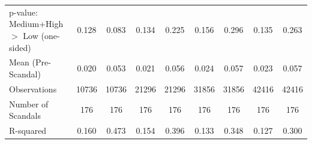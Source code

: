 {\begin{tabular}{l*{8}{c}}
p-value: Medium+High $>$ Low (one-sided)&       0.128         &       0.083         &       0.134         &       0.225         &       0.156         &       0.296         &       0.135         &       0.263         \\
Mean (Pre-Scandal)&       0.020         &       0.053         &       0.021         &       0.056         &       0.024         &       0.057         &       0.023         &       0.057         \\
Observations&       10736         &       10736         &       21296         &       21296         &       31856         &       31856         &       42416         &       42416         \\
Number of Scandals&         176         &         176         &         176         &         176         &         176         &         176         &         176         &         176         \\
R-squared   &       0.160         &       0.473         &       0.154         &       0.396         &       0.133         &       0.348         &       0.127         &       0.300         \\
\bottomrule
\end{tabular}
}
